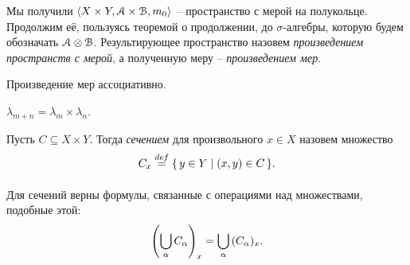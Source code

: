 \begin{definition}

    Мы получили $\langle X \times Y, \mathcal{A} \times \mathcal{B}, m_0 \rangle$ -- пространство с
    мерой на полукольце. Продолжим её, пользуясь теоремой о продолжении,
    до $\sigma$-алгебры, которую будем обозначать $\mathcal{A} \otimes \mathcal{B}$. Результирующее пространство
    назовем \textit{произведением пространств с мерой}, а полученную меру -- \textit{произведением мер}.
\end{definition}

\begin{theorem}
    Произведение мер ассоциативно.
\end{theorem}

\begin{theorem}
    $\lambda_{m + n} = \lambda_{m} \times \lambda_{n}$.
\end{theorem}

\begin{definition}
    Пусть $C \subseteq X \times Y$. Тогда \textit{сечением} для произвольного $x \in X$
    назовем множество
\[
    C_x \overset{def}{\underset{}{=}} \{\,y \in Y \mid (x, y) \in C\,\}
.\] 
\end{definition}

\begin{remark}
    Для сечений верны формулы, связанные с операциями над множествами,
    подобные этой:
\[
    \left(\bigcup_{\alpha}{C_{\alpha}}\right)_x = \bigcup_{\alpha}{(C_{\alpha})_x}
.\] 
\end{remark}

